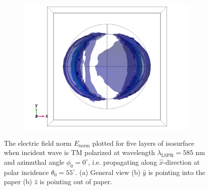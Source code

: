 \begin{figure}[h]
\begin{subfigure}{0.33\textwidth}
        \centering
        \includegraphics[width=\linewidth, trim=0.6cm 0 1.6cm 0, clip]{figures/ch4/S6/normE/Sample6_nomE_wl585_phi0_TM_ztowardsviewer.png}
        \caption{}
    \end{subfigure}
    \caption{The electric field norm $E_\text{norm}$ plotted for five layers of isosurface when incident wave is TM polarized at wavelength $\lambda_{\text{LSPR}}=585$ nm and azimuthal angle $\phi_0=0^\circ$, i.e. propagating along $\hat{x}$-direction at polar incidence $\theta_0=55^\circ$. (a) General view (b) $\hat{y}$ is pointing into the paper (b) $\hat{z}$ is pointing out of paper.}
    \label{fig:S6_normE_isosurface_LSPR}
\end{figure}





\clearpage
